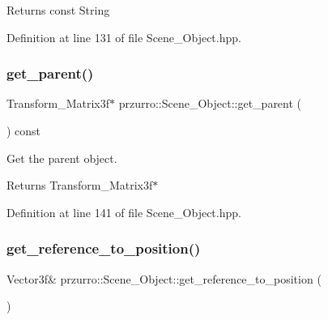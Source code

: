 \begin{DoxyReturn}{Returns}
const String 
\end{DoxyReturn}


Definition at line 131 of file Scene\+\_\+\+Object.\+hpp.

\mbox{\label{classprzurro_1_1_scene___object_a49ee712564b1cb5cc21a58286bded165}} 
\subsubsection{\texorpdfstring{get\_parent()}{get\_parent()}}
{\footnotesize\ttfamily Transform\+\_\+\+Matrix3f$\ast$ przurro\+::\+Scene\+\_\+\+Object\+::get\+\_\+parent (\begin{DoxyParamCaption}{ }\end{DoxyParamCaption}) const\hspace{0.3cm}{\ttfamily [inline]}}



Get the parent object. 

\begin{DoxyReturn}{Returns}
Transform\+\_\+\+Matrix3f$\ast$ 
\end{DoxyReturn}


Definition at line 141 of file Scene\+\_\+\+Object.\+hpp.

\mbox{\label{classprzurro_1_1_scene___object_abeb836faf2b3cb2a93f082a10e3f684b}} 
\subsubsection{\texorpdfstring{get\_reference\_to\_position()}{get\_reference\_to\_position()}}
{\footnotesize\ttfamily Vector3f\& przurro\+::\+Scene\+\_\+\+Object\+::get\+\_\+reference\+\_\+to\+\_\+position (\begin{DoxyParamCaption}{ }\end{DoxyParamCaption})\hspace{0.3cm}{\ttfamily [inline]}}



